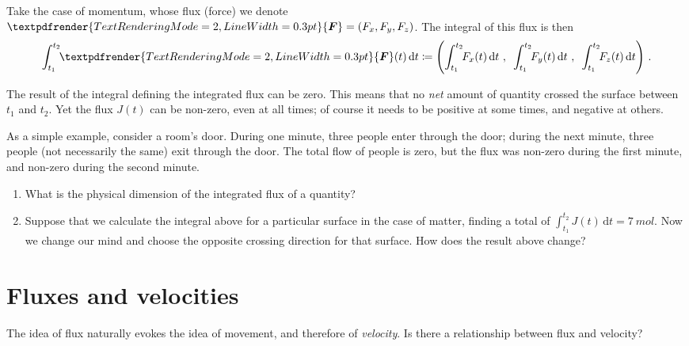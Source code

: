 \documentclass[a4paper,12pt,%
onecolumn,oneside,titlepage,%
british%
]{memoir}
\renewcommand*{\bm}[1]{\textpdfrender{TextRenderingMode=2,LineWidth=0.3pt}{\boldsymbol{#1}}}
\newcommand*{\di}{\mathrm{d}}%
\newcommand*{\defd}{\coloneqq}
\renewcommand*{\|}[1][]{\nonscript\:#1\vert\nonscript\:\mathopen{}}
\newcommand*{\yJ}{J}
\newcommand*{\yF}{\bm{F}}
\begin{document}
Take the case of momentum, whose flux (force) we denote $\yF=(F_{x}, F_{y}, F_{z})$. The integral of this flux is then
\begin{equation}
  \label{eq:total_flow_integral_vector}
  \int_{t_{1}}^{t_{2}}\!\! \yF(t)\,\di t \defd
  \Biggl(
  \int_{t_{1}}^{t_{2}}\!\! F_{x}(t)\,\di t \ ,\enspace
  \int_{t_{1}}^{t_{2}}\!\! F_{y}(t)\,\di t \ ,\enspace
  \int_{t_{1}}^{t_{2}}\!\! F_{z}(t)\,\di t
  \Biggr) \ .
\end{equation}

\medskip

\begin{warning}
  The result of the integral defining the integrated flux can be zero. This means that no \emph{net} amount of quantity crossed the surface between $t_{1}$ and $t_{2}$. Yet the flux $\yJ(t)$ can be non-zero, even at all times; of course it needs to be positive at some times, and negative at others.
\end{warning}
As a simple example, consider a room's door. During one minute, three people enter through the door; during the next minute, three people (not necessarily the same) exit through the door. The total flow of people is zero, but the flux was non-zero during the first minute, and non-zero during the second minute.

\smallskip

\begin{exercise}
  \begin{enumerate}[shift,label=\bfseries\arabic*.]
  \item What is the physical dimension of the integrated flux of a quantity?
  \item Suppose that we calculate the integral above for a particular surface in the case of matter, finding a total of $\int_{t_{1}}^{t_{2}}\!\! \yJ(t)\,\di t = \qty{7}{mol}$. Now we change our mind and choose the opposite crossing direction for that surface. How does the result above change?
  \end{enumerate}
\end{exercise}

\section{Fluxes and velocities}
\label{sec:fluxes_velocities}

The idea of flux naturally evokes the idea of movement, and therefore of \emph{velocity}. Is there a relationship between flux and velocity?
\end{document}
